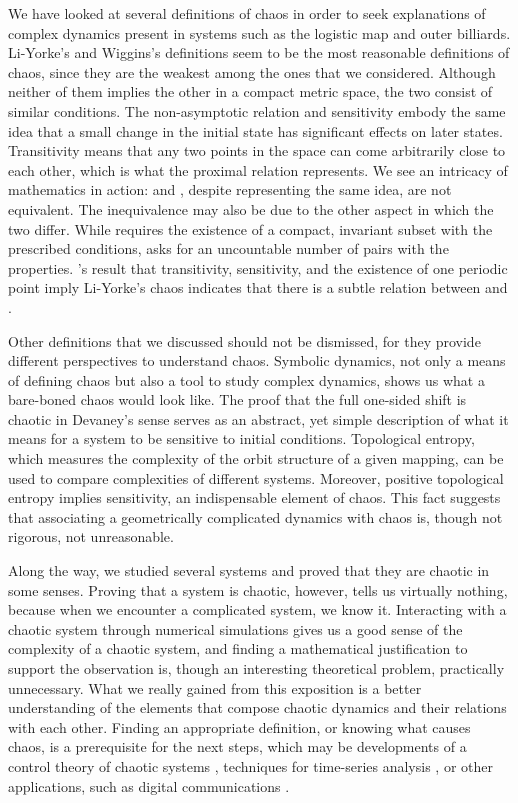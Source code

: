 \documentclass[10pt,twoside,draft]{book}
\begin{document}
We have looked at several definitions of chaos in order to seek explanations of complex dynamics present in systems such as the logistic map and outer billiards.
Li-Yorke's and Wiggins's definitions seem to be the most reasonable definitions of chaos, since they are the weakest among the ones that we considered.
Although neither of them implies the other in a compact metric space, the two consist of similar conditions.
The non-asymptotic relation and sensitivity embody the same idea that a small change in the initial state has significant effects on later states.
Transitivity means that any two points in the space can come arbitrarily close to each other, which is what the proximal relation represents.
We see an intricacy of mathematics in action: \wig and \liy, despite representing the same idea, are not equivalent.
The inequivalence may also be due to the other aspect in which the two differ.
While \wig requires the existence of a compact, invariant subset with the prescribed conditions, \liy asks for an uncountable number of pairs with the properties. 
\citet{mai}'s result that transitivity, sensitivity, and the existence of one periodic point imply Li-Yorke's chaos indicates that there is a subtle relation between \liy and \wig.


Other definitions that we discussed should not be dismissed, for they provide different perspectives to understand chaos.
Symbolic dynamics, not only a means of defining chaos but also a tool to study complex dynamics, shows us what a bare-boned chaos would look like.
The proof that the full one-sided shift is chaotic in Devaney's sense serves as an abstract, yet simple description of what it means for a system to be sensitive to initial conditions.
Topological entropy, which measures the complexity of the orbit structure of a given mapping, can be used to compare complexities of different systems.
Moreover, positive topological entropy implies sensitivity, an indispensable element of chaos.
This fact suggests that associating a geometrically complicated dynamics with chaos is, though not rigorous, not unreasonable.


Along the way, we studied several systems and proved that they are chaotic in some senses.
Proving that a system is chaotic, however, tells us virtually nothing, because when we encounter a complicated system, we know it.
Interacting with a chaotic system through numerical simulations gives us a good sense of the complexity of a chaotic system, and finding a mathematical justification to support the observation is, though an interesting theoretical problem, practically unnecessary.
What we really gained from this exposition is a better understanding of the elements that compose chaotic dynamics and their relations with each other.
Finding an appropriate definition, or knowing what causes chaos, is a prerequisite for the next steps, which may be developments of a control theory of chaotic systems \citep{openproblems, chaos-frontiers}, techniques for time-series analysis \citep{kantz-schreiber, sprott, abarbanel}, or other applications, such as digital communications \citep{chaos-communication}.
\end{document}
